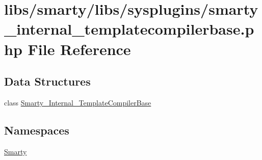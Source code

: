 \hypertarget{smarty__internal__templatecompilerbase_8php}{}\section{libs/smarty/libs/sysplugins/smarty\+\_\+internal\+\_\+templatecompilerbase.php File Reference}
\label{smarty__internal__templatecompilerbase_8php}
\subsection*{Data Structures}
\begin{DoxyCompactItemize}
\item 
class \hyperlink{class_smarty___internal___template_compiler_base}{Smarty\+\_\+\+Internal\+\_\+\+Template\+Compiler\+Base}
\end{DoxyCompactItemize}
\subsection*{Namespaces}
\begin{DoxyCompactItemize}
\item 
 \hyperlink{namespace_smarty}{Smarty}
\end{DoxyCompactItemize}
